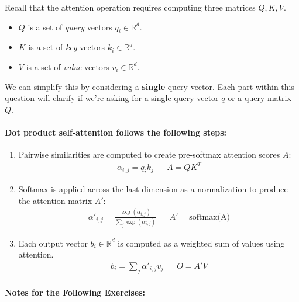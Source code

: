 \documentclass{article}
\begin{document}
Recall that the attention operation requires computing three matrices $Q,K,V$.

\begin{itemize}
    \item $Q$ is a set of \textit{query} vectors $q_i \in \mathbb{R}^d$.
    \item $K$ is a set of \textit{key} vectors $k_i \in \mathbb{R}^d$.
    \item $V$ is a set of \textit{value} vectors $v_i \in \mathbb{R}^d$.
\end{itemize}

We can simplify this by considering a \textbf{single} query vector. Each part
within this question will clarify if we're asking for a single query vector $q$
or a query matrix $Q$.

\paragraph{Dot product self-attention follows the following steps:}

\begin{enumerate}
    \item Pairwise similarities are computed to create pre-softmax attention
    scores $A$:
    \begin{align*}
        \alpha_{i,j} = q_i k_j
        & &
        A = Q K^T
    \end{align*}
    
    \item Softmax is applied across the last dimension as a normalization to
    produce the attention matrix $A'$:
    \begin{align*}
        \alpha'_{i,j} = \frac{\exp(\alpha_{i,j})}{\sum_j \exp(\alpha_{i,j})}
        & &
        A' = \text{softmax(A)}
    \end{align*}

    \item Each output vector $b_i \in \mathbb{R}^d$ is computed as a weighted
    sum of values using attention.
    \begin{align*}
        b_i = \sum_j \alpha'_{i,j} v_j
        & &
        O = A' V
    \end{align*}

\end{enumerate}


\newpage


\paragraph{Notes for the Following Exercises:}
\end{document}
